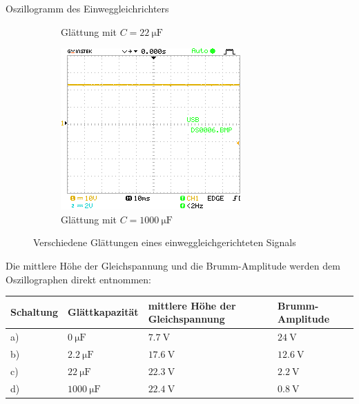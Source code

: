 \documentclass{article}
\theoremstyle{definition}
\begin{document}
\begin{aufgabe}{Oszillogramm des Einweggleichrichters}
\begin{figure}[H]
\begin{subfigure}[b]{0.49 \textwidth}
            \caption{Glättung mit $C = \SI{22}{\micro\farad}$}
            \label{a3_c}
        \end{subfigure}
        \hfill
        \begin{subfigure}[b]{0.49 \textwidth}
            \includegraphics[width=\textwidth]{MesswerteVersuch2/DS0006.png}
            \caption{Glättung mit $C = \SI{1000}{\micro\farad}$}
            \label{a3_d}
        \end{subfigure}
        \caption{Verschiedene Glättungen eines einweggleichgerichteten Signals}
        \label{a3}
    \end{figure}
    Die mittlere Höhe der Gleichspannung und die Brumm-Amplitude werden dem Oszillographen direkt entnommen:
    \begin{table}[H]
        \centering
        \begin{tabular}{|l|l|l|l|}
            \hline
            Schaltung & Glättkapazität & mittlere Höhe der Gleichspannung & Brumm-Amplitude  \\
            \hline
            a) & $\SI{0}{\micro\farad}$ & $\SI{7.7}{\volt}$ & $\SI{24}{\volt}$ \\
            b) & $\SI{2.2}{\micro\farad}$ & $\SI{17.6}{\volt}$ & $\SI{12.6}{\volt}$ \\
            c) & $\SI{22}{\micro\farad}$ & $\SI{22.3}{\volt}$ & $\SI{2.2}{\volt}$ \\
            d) & $\SI{1000}{\micro\farad}$ & $\SI{22.4}{\volt}$ & $\SI{0.8}{\volt}$ \\

\end{tabular}
\end{table}
\end{aufgabe}
\end{document}
